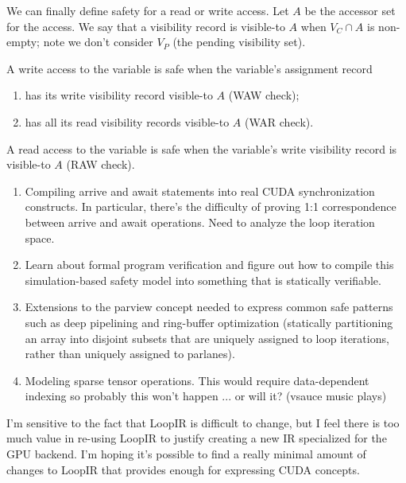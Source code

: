 \filbreak
{} We can finally define safety for a read or write access.
Let $A$ be the accessor set for the access.
We say that a visibility record is visible-to $A$ when ${V_C \cap A}$ is non-empty; note we don't consider $V_P$ (the pending visibility set).

A write access to the variable is safe when the variable's assignment record
\begin{enumerate}
  \item has its write visibility record visible-to $A$ (WAW check);
  \item has all its read visibility records visible-to $A$ (WAR check).
\end{enumerate}
A read access to the variable is safe when the variable's write visibility record is visible-to $A$ (RAW check).

\filbreak
{}

\begin{enumerate}
  \item Compiling arrive and await statements into real CUDA synchronization constructs.
    In particular, there's the difficulty of proving 1:1 correspondence between arrive and await operations.
    Need to analyze the loop iteration space.
  \item Learn about formal program verification and figure out how to compile this simulation-based safety model into something that is statically verifiable.
  \item Extensions to the parview concept needed to express common safe patterns such as deep pipelining and ring-buffer optimization (statically partitioning an array into disjoint subsets that are uniquely assigned to loop iterations, rather than uniquely assigned to parlanes).
  \item Modeling sparse tensor operations. This would require data-dependent indexing so probably this won't happen ... or will it? (vsauce music plays)
\end{enumerate}

\newpage
{}

I'm sensitive to the fact that LoopIR is difficult to change, but I feel there is too much value in re-using LoopIR to justify creating a new IR specialized for the GPU backend.
I'm hoping it's possible to find a really minimal amount of changes to LoopIR that provides enough for expressing CUDA concepts.

